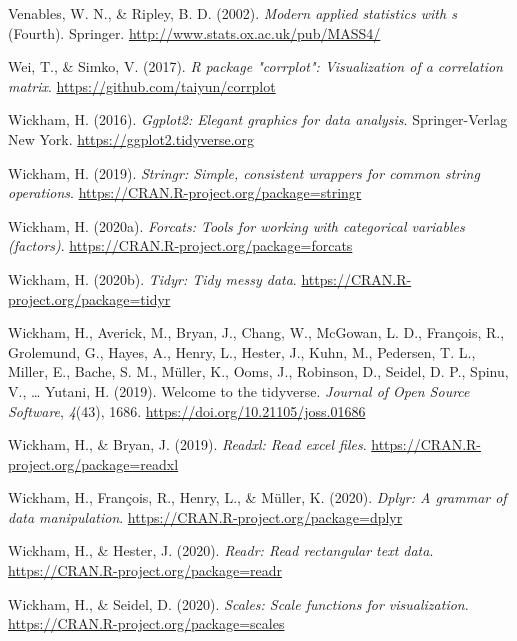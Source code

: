 \documentclass[
  english,
  man, noextraspace]{apa7}
\begin{document}
\begin{appendix}
\leavevmode\hypertarget{ref-R-MASS}{}%
Venables, W. N., \& Ripley, B. D. (2002). \emph{Modern applied
statistics with s} (Fourth). Springer.
\url{http://www.stats.ox.ac.uk/pub/MASS4/}

\leavevmode\hypertarget{ref-R-corrplot2017}{}%
Wei, T., \& Simko, V. (2017). \emph{R package "corrplot": Visualization
of a correlation matrix}. \url{https://github.com/taiyun/corrplot}

\leavevmode\hypertarget{ref-R-ggplot2}{}%
Wickham, H. (2016). \emph{Ggplot2: Elegant graphics for data analysis}.
Springer-Verlag New York. \url{https://ggplot2.tidyverse.org}

\leavevmode\hypertarget{ref-R-stringr}{}%
Wickham, H. (2019). \emph{Stringr: Simple, consistent wrappers for
common string operations}.
\url{https://CRAN.R-project.org/package=stringr}

\leavevmode\hypertarget{ref-R-forcats}{}%
Wickham, H. (2020a). \emph{Forcats: Tools for working with categorical
variables (factors)}. \url{https://CRAN.R-project.org/package=forcats}

\leavevmode\hypertarget{ref-R-tidyr}{}%
Wickham, H. (2020b). \emph{Tidyr: Tidy messy data}.
\url{https://CRAN.R-project.org/package=tidyr}

\leavevmode\hypertarget{ref-R-tidyverse}{}%
Wickham, H., Averick, M., Bryan, J., Chang, W., McGowan, L. D.,
François, R., Grolemund, G., Hayes, A., Henry, L., Hester, J., Kuhn, M.,
Pedersen, T. L., Miller, E., Bache, S. M., Müller, K., Ooms, J.,
Robinson, D., Seidel, D. P., Spinu, V., \ldots{} Yutani, H. (2019).
Welcome to the tidyverse. \emph{Journal of Open Source Software},
\emph{4}(43), 1686. \url{https://doi.org/10.21105/joss.01686}

\leavevmode\hypertarget{ref-R-readxl}{}%
Wickham, H., \& Bryan, J. (2019). \emph{Readxl: Read excel files}.
\url{https://CRAN.R-project.org/package=readxl}

\leavevmode\hypertarget{ref-R-dplyr}{}%
Wickham, H., François, R., Henry, L., \& Müller, K. (2020). \emph{Dplyr:
A grammar of data manipulation}.
\url{https://CRAN.R-project.org/package=dplyr}

\leavevmode\hypertarget{ref-R-readr}{}%
Wickham, H., \& Hester, J. (2020). \emph{Readr: Read rectangular text
data}. \url{https://CRAN.R-project.org/package=readr}

\leavevmode\hypertarget{ref-R-scales}{}%
Wickham, H., \& Seidel, D. (2020). \emph{Scales: Scale functions for
visualization}. \url{https://CRAN.R-project.org/package=scales}


\end{appendix}
\end{document}
